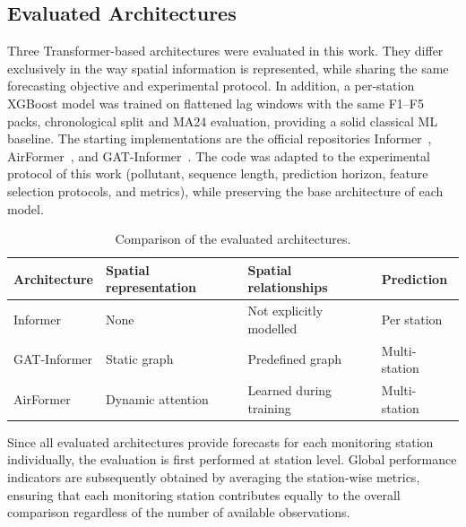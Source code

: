 \documentclass[11pt]{article}
\newenvironment{revnewblock}{%
  \begingroup\color{orange!75!black}%
}{%
  \endgroup%
}
\begin{document}
\begin{revnewblock}
\subsection{Evaluated Architectures}
\label{sec:methodology-gat}
Three Transformer-based architectures were evaluated in this work. They differ exclusively in the way spatial information is represented, while sharing the same forecasting objective and experimental protocol. In addition, a per-station XGBoost model was trained on flattened lag windows with the same F1--F5 packs, chronological split and MA24 evaluation, providing a solid classical ML baseline. The starting implementations are the official repositories Informer~\cite{Zhou2021Informer,Zhou2023InformerEx}, AirFormer~\cite{liang2022airformer}, and GAT-Informer~\cite{YU2023110864}. The code was adapted to the experimental protocol of this work (pollutant, sequence length, prediction horizon, feature selection protocols, and metrics), while preserving the base architecture of each model.

\begin{table}[H]
\centering
\caption{Comparison of the evaluated architectures.}
\label{tab:architectures}
\renewcommand{\arraystretch}{1.15}
\begin{tabular}{p{3cm}p{3cm}p{3.2cm}p{2.5cm}}
\toprule
\textbf{Architecture} &
\textbf{Spatial representation} &
\textbf{Spatial relationships} &
\textbf{Prediction}\\
\midrule
Informer &
None &
Not explicitly modelled &
Per station \\
GAT-Informer &
Static graph &
Predefined graph &
Multi-station \\
AirFormer &
Dynamic attention &
Learned during training &
Multi-station \\
\bottomrule
\end{tabular}
\end{table}

Since all evaluated architectures provide forecasts for each monitoring station individually, the evaluation is first performed at station level. Global performance indicators are subsequently obtained by averaging the station-wise metrics, ensuring that each monitoring station contributes equally to the overall comparison regardless of the number of available observations.


\end{revnewblock}
\end{document}
